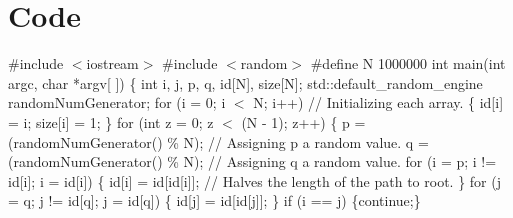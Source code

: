 \documentclass[]{article}
\begin{document}
\section*{Code}
\#include $<$iostream$>$\newline
\#include $<$random$>$\newline\newline
\#define N 1000000\newline
\newline
int main(int argc, char *argv[ ])\newline
\{\newline
\indent int i, j, p, q, id[N], size[N];\newline
\indent std::default\_random\_engine randomNumGenerator;\newline\newline
\indent for (i = 0; i $<$ N; i++) // Initializing each array.\newline
\indent \{\newline
\indent\indent id[i] = i;\newline
\indent\indent size[i] = 1;\newline
\indent \}\newline\newline
\indent for (int z = 0; z $<$ (N - 1); z++)\newline
\indent \{\newline
\indent\indent p = (randomNumGenerator() \% N); // Assigning p a random value.\newline
\indent\indent q = (randomNumGenerator() \% N); // Assigning q a random value.\newline\newline
\indent\indent for (i = p; i != id[i]; i = id[i])\newline
\indent\indent \{\newline
\indent\indent\indent id[i] = id[id[i]]; // Halves the length of the path to root.\newline
\indent\indent \}\newline
\indent\indent for (j = q; j != id[q]; j = id[q])\newline
\indent\indent \{\newline
\indent\indent\indent id[j] = id[id[j]];\newline
\indent\indent \}\newline\newline
\indent\indent if (i == j) \{continue;\}\newline\newline
\end{document}

